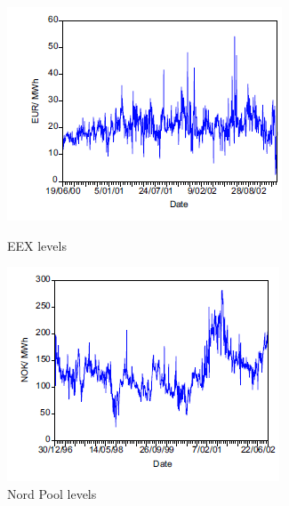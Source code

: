 \begin{figure}[!htbp]
  \centering
  \begin{minipage}[b]{0.4\textwidth}
    \includegraphics[width=\textwidth]{figures/state_of_the_art/EEX_levels.PNG}
    \caption{EEX levels \cite{mugele2005stable}}
		\label{fig:EEX_levels}
  \end{minipage}
  \hfill
  \begin{minipage}[b]{0.4\textwidth}
    \includegraphics[width=\textwidth]{figures/state_of_the_art/NordPool_levels.PNG}
    \caption{Nord Pool levels \cite{mugele2005stable}}
		\label{fig:NordPool_levels}
  \end{minipage}
\end{figure}

